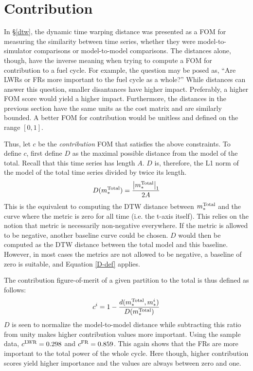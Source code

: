 \clearpage
\section{Contribution}
\label{contribution}

In \S\ref{dtw}, the dynamic time warping distance was presented as a 
FOM for measuring the similarity between time series, whether they 
were model-to-simulator comparisons or model-to-model comparisons.
The distances alone, though, have the inverse meaning when trying to 
compute a FOM for contribution to a fuel cycle.  For example, the 
question may be posed as, ``Are LWRs or FRs more important to the fuel 
cycle as a whole?'' While distances can answer this question, smaller 
disantances have higher impact. Preferably, a higher FOM score would yield a 
higher impact. Furthermore, the distances in the previous section have
the same units as the cost matrix and are similarly bounded. A better 
FOM for contribution would be unitless and defined on the range $[0,1]$.

Thus, let $c$ be the \emph{contribution} FOM that satisfies the above 
constraints. To define $c$, first define $D$ as the maximal possible 
distance from the model of the total. Recall that this time series has length $A$.
$D$ is, therefore, the L1 norm of the model of the total time series divided
by twice its length. 
\begin{equation}
\label{D-def}
D(m_*^{\mathrm{Total}}) = \frac{\left|m_*^{\mathrm{Total}}\right|_1}{2A}
\end{equation}
This is the equivalent to computing the DTW distance
between $m_*^{\mathrm{Total}}$ and the curve where the metric is zero for all time 
(i.e. the t-axis itself).  This relies on the notion that 
metric is necessarily non-negative everywhere.  If the metric is allowed to 
be negative, another baseline curve could be chosen. $D$ would then be 
computed as the DTW distance between the total model and this baseline.
However, in most cases the metrics are not allowed to be negative, 
a baseline of zero is suitable, and Equation \ref{D-def} applies.

The contribution figure-of-merit of a given partition to the total is thus 
defined as follows:
\begin{equation}
\label{cont}
c^i = 1 - \frac{d(m_*^{\mathrm{Total}}, m_*^i)}{D(m_*^{\mathrm{Total}})}
\end{equation}
$D$ is seen to normalize the model-to-model distance while subtracting this
ratio from unity makes higher contribution values more important.  
Using the sample data, $c^{\mathrm{LWR}} = 0.298$ and $c^{\mathrm{FR}} = 0.859$. This again shows
that the FRs are more important to the total power of the whole cycle.
Here though, higher contribution scores yield higher importance and the values
are always between zero and one.

